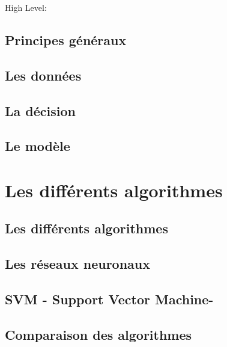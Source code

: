 \begin{description}
	\item[High Level: ]
	\item[]
\end{description}
 
\subsection{Principes généraux}
\label{Le Machine Learning: Les différents algorithmes: Principes généraux}

\subsection{Les données}
\label{Le Machine Learning: Les différents algorithmes: Les données}

\subsection{La décision}
\label{Le Machine Learning: Les différents algorithmes: La décision}

\subsection{Le modèle}
\label{Le Machine Learning: Les différents algorithmes: Le modèle}


\section{Les différents algorithmes}
\label{ILe Machine Learning: Les différents algorithmes}

\subsection{Les différents algorithmes}
\label{ILe Machine Learning: Les différents algorithmes: La regression logistique}

\subsection{Les réseaux neuronaux}
\label{ILe Machine Learning: Les différents algorithmes: Les réseaux neuronaux}

\subsection{SVM - Support Vector Machine-}
\label{ILe Machine Learning: Les différents algorithmes: SVM}

\subsection{Comparaison des algorithmes}
\label{ILe Machine Learning: Les différents algorithmes: Comparaison des algorithmes}